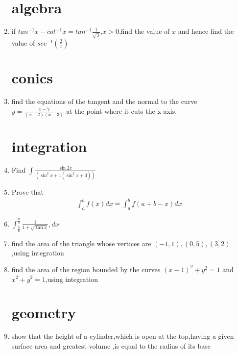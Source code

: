\documentclass[10pt,-letter paper]{article}
\providecommand{\brak}[1]{\ensuremath{\left(#1\right)}}
\begin{document}
\begin{enumerate}
\section{algebra}
\item if $tan^{-1}x-cot^{-1}x=tan^{-1}\frac{1}{\sqrt{3}}$,$x>0$,find the value of $x$ and hence find the value of $sec^{-1}\brak{\frac{2}{x}}$
	
\section{conics}
\item find the equations of the tangent and the normal to the curve  $y=\frac{x-7}{\brak{x-2}\brak{x-3}}$ at the point where it cuts the x-axis.
	
\section{integration}
\item Find $\int\frac{\sin{2x}}{\brak{\sin^2{x+1}\brak{\sin^2 {x+3}}}}$
\item Prove that 
	\begin{align*}
		\int_{a}^{b} f\brak{x}dx= \int_{a}^{b} f\brak{a+b-x}dx
	\end{align*}
		
\item $\int_{\frac{\pi}{6}}^{\frac{\pi}{3}} \frac{1}{1+\sqrt{\tan{x}}},dx$
\item find the area of the triangle whose vertices are $\brak{-1,1    },\brak{0,5},\brak{3,2}$,using integration                  
\item find the area of the region bounded by the curves $\brak{x-1}^2+y^2=1$ and $x^2+y^2=1$,using integration

\section{geometry}
\item show that the height of a cylinder,which is open at the top,having a given surface area and greatest volume ,is equal to the radius of its base


\end{enumerate}
\end{document}
